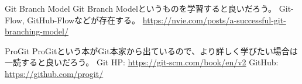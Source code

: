\documentclass[10pt,a4j,openany,dvipdfmx]{jsarticle}
\begin{document}
\begin{skybox}{Git Branch Model}
Git Branch Modelというものを学習すると良いだろう。
Git-Flow, GitHub-Flowなどが存在する。
\tcblower
\url{https://nvie.com/posts/a-successful-git-branching-model/}
\end{skybox}

\begin{redbox}{ProGit}
ProGitという本がGit本家から出ているので、より詳しく学びたい場合は一読すると良いだろう。
\tcblower
Git HP: \url{https://git-scm.com/book/en/v2}
GitHub: \url{https://github.com/progit/}
\end{redbox}




\end{document}
